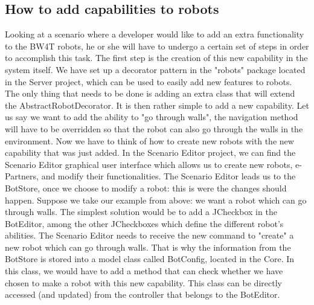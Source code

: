 \subsection{How to add capabilities to robots}
Looking at a scenario where a developer would like to add an extra functionality to the BW4T robots, he or she will have to undergo a certain set of steps in order to accomplish this task. 
\newline
The first step is the creation of this new capability in the system itself. We have set up a decorator pattern in the "robots" package located in the Server project, which can be used to easily add new features to robots. The only thing that needs to be done is adding an extra class that will extend the AbstractRobotDecorator. It is then rather simple to add a new capability. 
\newline
Let us say we want to add the ability to "go through walls", the navigation method will have to be overridden so that the robot can also go through the walls in the environment. 
\newline
\newline
Now we have to think of how to create new robots with the new capability that was just added. In the Scenario Editor project, we can find the Scenario Editor graphical user interface which allows us to create new robots, e-Partners, and modify their functionalities. 
\newline
The Scenario Editor leads us to the BotStore, once we choose to modify a robot: this is were the changes should happen. Suppose we take our example from above: we want a robot which can go through walls. The simplest solution would be to add a JCheckbox in the BotEditor, among the other JCheckboxes which define the different robot's abilities. 
\newline
The Scenario Editor needs to receive the new command to "create" a new robot which can go through walls. That is why the information from the BotStore is stored into a model class called BotConfig, located in the Core. In this class, we would have to add a method that can check whether we have chosen to make a robot with this new capability. This class can be directly accessed (and updated) from the controller that belongs to the BotEditor. 

